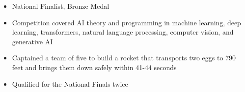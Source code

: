 \documentclass[9pt,a4paper,ragged2e]{altacv}
\begin{document}
\begin{itemize} \itemsep 0pt
  \item National Finalist, Bronze Medal
  \item Competition covered AI theory and programming in machine learning, deep learning, transformers, natural language processing, computer vision, and generative AI
\end{itemize}



\divider

\begin{itemize} \itemsep 0pt
  \item Captained a team of five to build a rocket that transports two eggs to 790 feet and brings them down safely within 41-44 seconds
  \item Qualified for the National Finals twice
\end{itemize}








\end{document}
